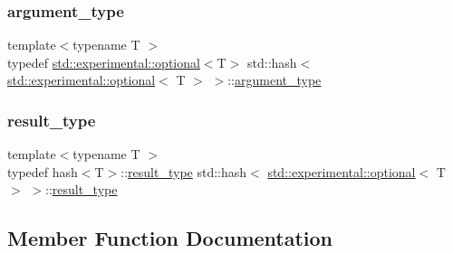 \subsubsection{\texorpdfstring{argument\+\_\+type}{argument\_type}}
{\footnotesize\ttfamily template$<$typename T $>$ \\
typedef \mbox{\hyperlink{classstd_1_1experimental_1_1optional}{std\+::experimental\+::optional}}$<$T$>$ std\+::hash$<$ \mbox{\hyperlink{classstd_1_1experimental_1_1optional}{std\+::experimental\+::optional}}$<$ T $>$ $>$\+::\mbox{\hyperlink{structstd_1_1hash_3_01std_1_1experimental_1_1optional_3_01_t_01_4_01_4_a990f41de75472068a98961bde97c9f6f}{argument\+\_\+type}}}

\mbox{\label{structstd_1_1hash_3_01std_1_1experimental_1_1optional_3_01_t_01_4_01_4_a1ffc134496ff2e1dedb167899d460b6b}} 
\subsubsection{\texorpdfstring{result\+\_\+type}{result\_type}}
{\footnotesize\ttfamily template$<$typename T $>$ \\
typedef hash$<$T$>$\+::\mbox{\hyperlink{structstd_1_1hash_3_01std_1_1experimental_1_1optional_3_01_t_01_4_01_4_a1ffc134496ff2e1dedb167899d460b6b}{result\+\_\+type}} std\+::hash$<$ \mbox{\hyperlink{classstd_1_1experimental_1_1optional}{std\+::experimental\+::optional}}$<$ T $>$ $>$\+::\mbox{\hyperlink{structstd_1_1hash_3_01std_1_1experimental_1_1optional_3_01_t_01_4_01_4_a1ffc134496ff2e1dedb167899d460b6b}{result\+\_\+type}}}



\subsection{Member Function Documentation}
\mbox{\label{structstd_1_1hash_3_01std_1_1experimental_1_1optional_3_01_t_01_4_01_4_a3fbf26e96a387fac81dc1fcaf163ce3c}} 
